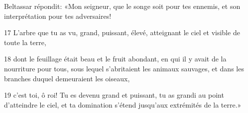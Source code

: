 Beltassar répondit: «Mon seigneur, que le songe soit pour tes ennemis, et son interprétation pour tes adversaires!

17 L’arbre que tu as vu, grand, puissant, élevé, atteignant le ciel et visible de toute la terre,

18 dont le feuillage était beau et le fruit abondant, en qui il y avait de la nourriture pour tous, sous lequel s’abritaient les animaux sauvages, et dans les branches duquel demeuraient les oiseaux,

19 c’est toi, ô roi! Tu es devenu grand et puissant, tu as grandi au point d’atteindre le ciel, et ta domination s’étend jusqu’aux extrémités de la terre.»
